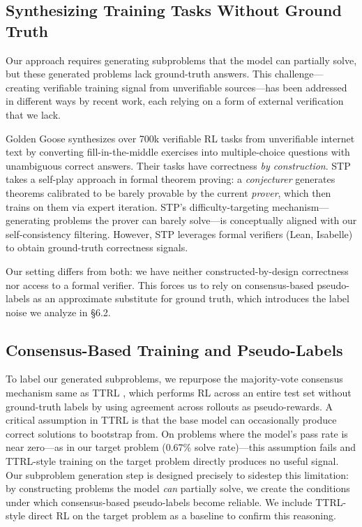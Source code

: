 \documentclass{article}
\begin{document}
\subsection{Synthesizing Training Tasks Without Ground Truth}
\label{sec:synth}

Our approach requires generating subproblems that the model can partially solve, but these generated problems lack ground-truth answers. This challenge—creating verifiable training signal from unverifiable sources—has been addressed in different ways by recent work, each relying on a form of external verification that we lack.

Golden Goose \cite{goldengoose} synthesizes over 700k verifiable RL tasks from unverifiable internet text by converting fill-in-the-middle exercises into multiple-choice questions with unambiguous correct answers. Their tasks have correctness \textit{by construction}. STP \cite{stp} takes a self-play approach in formal theorem proving: a \textit{conjecturer} generates theorems calibrated to be barely provable by the current \textit{prover}, which then trains on them via expert iteration. STP's difficulty-targeting mechanism—generating problems the prover can barely solve—is conceptually aligned with our self-consistency filtering. However, STP leverages formal verifiers (Lean, Isabelle) to obtain ground-truth correctness signals.

Our setting differs from both: we have neither constructed-by-design correctness nor access to a formal verifier. This forces us to rely on consensus-based pseudo-labels as an approximate substitute for ground truth, which introduces the label noise we analyze in \S6.2.

\subsection{Consensus-Based Training and Pseudo-Labels}
\label{sec:rl_testset}

To label our generated subproblems, we repurpose the majority-vote consensus mechanism same as TTRL \cite{ttrl}, which performs RL across an entire test set without ground-truth labels by using agreement across rollouts as pseudo-rewards. A critical assumption in TTRL is that the base model can occasionally produce correct solutions to bootstrap from. On problems where the model's pass rate is near zero—as in our target problem (0.67\% solve rate)—this assumption fails and TTRL-style training on the target problem directly produces no useful signal. Our subproblem generation step is designed precisely to sidestep this limitation: by constructing problems the model \textit{can} partially solve, we create the conditions under which consensus-based pseudo-labels become reliable. We include TTRL-style direct RL on the target problem as a baseline to confirm this reasoning.
\end{document}
